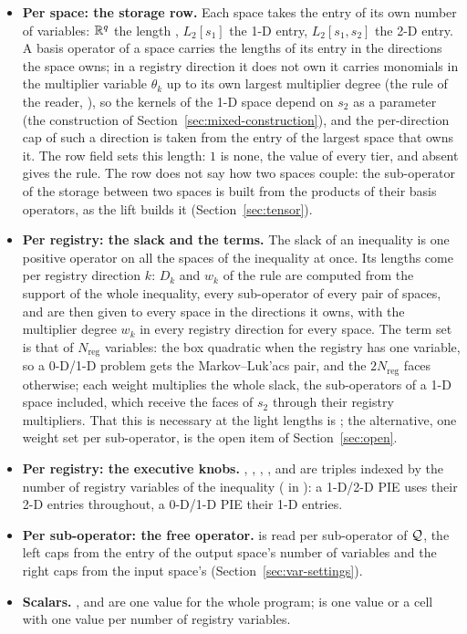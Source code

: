 \begin{itemize}\setlength\itemsep{0pt}
\item \textbf{Per space: the storage row.} Each space takes the entry of its own number of variables: $\mathbb{R}^q$ the length , $L_2[s_1]$ the 1-D entry, $L_2[s_1,s_2]$ the 2-D entry. A basis operator of a space carries the lengths of its entry in the directions the space owns; in a registry direction it does not own it carries monomials in the multiplier variable $\theta_k$ up to its own largest multiplier degree (the rule of the reader, \readerref), so the kernels of the 1-D space depend on $s_2$ as a parameter (the construction of Section~\ref{sec:mixed-construction}), and the per-direction cap of such a direction is taken from the entry of the largest space that owns it. The row field  sets this length: $1$ is none, the value of every tier, and absent gives the rule. The row does not say how two spaces couple: the sub-operator of the storage between two spaces is built from the products of their basis operators, as the lift builds it (Section~\ref{sec:tensor}).
\item \textbf{Per registry: the slack and the terms.} The slack of an inequality is one positive operator on all the spaces of the inequality at once. Its lengths come per registry direction $k$: $D_k$ and $w_k$ of the rule  are computed from the support of the whole inequality, every sub-operator of every pair of spaces, and are then given to every space in the directions it owns, with the multiplier degree $w_k$ in every registry direction for every space. The term set is that of $N_{\mathrm{reg}}$ variables: the box quadratic when the registry has one variable, so a 0-D/1-D problem gets the Markov--Luk'acs pair, and the $2N_{\mathrm{reg}}$ faces otherwise; each weight multiplies the whole slack, the sub-operators of a 1-D space included, which receive the faces of $s_2$ through their registry multipliers. That this is necessary at the light lengths is \liftref; the alternative, one weight set per sub-operator, is the open item of Section~\ref{sec:open}.
\item \textbf{Per registry: the executive knobs.} , , , ,  and  are triples indexed by the number of registry variables of the inequality ( in ): a 1-D/2-D PIE uses their 2-D entries throughout, a 0-D/1-D PIE their 1-D entries.
\item \textbf{Per sub-operator: the free operator.}  is read per sub-operator of $\mathcal{Q}$, the left caps from the entry of the output space's number of variables and the right caps from the input space's (Section~\ref{sec:var-settings}).
\item \textbf{Scalars.} ,  and  are one value for the whole program;  is one value or a cell with one value per number of registry variables.
\end{itemize}
